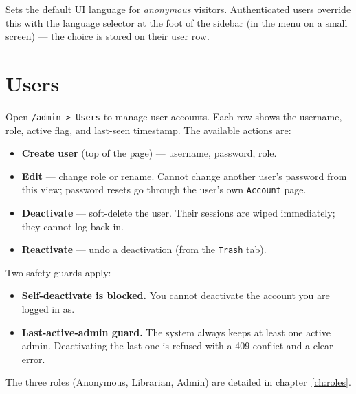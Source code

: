 Sets the default UI language for \emph{anonymous} visitors.
Authenticated users override this with the language selector at the
foot of the sidebar (in the menu on a small screen) — the choice is stored on their user row.

\section{Users}\label{sec:users}

Open \texttt{/admin > Users} to manage user accounts. Each row shows
the username, role, active flag, and last-seen timestamp. The
available actions are:

\begin{itemize}
  \item \textbf{Create user} (top of the page) — username, password,
        role.
  \item \textbf{Edit} — change role or rename. Cannot change another
        user's password from this view; password resets go through
        the user's own \texttt{Account} page.
  \item \textbf{Deactivate} — soft-delete the user. Their sessions
        are wiped immediately; they cannot log back in.
  \item \textbf{Reactivate} — undo a deactivation (from the
        \texttt{Trash} tab).
\end{itemize}

Two safety guards apply:

\begin{itemize}
  \item \textbf{Self-deactivate is blocked.} You cannot deactivate
        the account you are logged in as.
  \item \textbf{Last-active-admin guard.} The system always keeps at
        least one active admin. Deactivating the last one is
        refused with a 409 conflict and a clear error.
\end{itemize}

The three roles (Anonymous, Librarian, Admin) are
detailed in chapter~\ref{ch:roles}.
